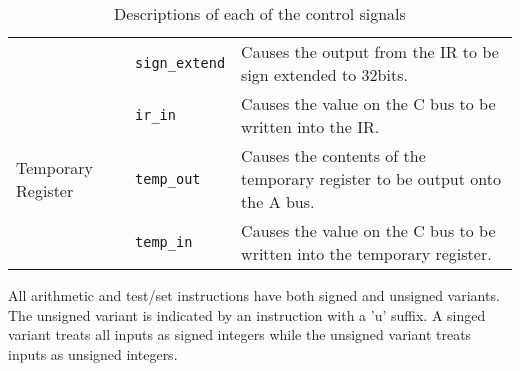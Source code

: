 \documentclass[a4paper,10pt]{article}
\begin{document}
\begin{table}[h]
\begin{center}
\begin{tabular}{|l|l|p{8cm}|}
\cline{2-3}
& \texttt{sign\_extend} & Causes the output from the IR to be sign
extended to 32bits. \\
\cline{2-3}
& \texttt{ir\_in} & Causes the value on the C bus to be written into
the IR. \\
\hline
Temporary Register & \texttt{temp\_out} & Causes the contents of the
temporary register to be output onto the A bus. \\
\cline{2-3}
& \texttt{temp\_in} & Causes the value on the C bus to be written into
the temporary register. \\
\hline
\end{tabular}
\end{center}
\caption{Descriptions of each of the control signals}
\label{table:signals}
\end{table}
\newpage
\begin{table}[h]
All arithmetic and test/set instructions have both signed and unsigned
variants. The unsigned variant is indicated by an instruction with a
'u' suffix. A singed variant treats all inputs as signed integers while
the unsigned variant treats inputs as unsigned integers.


\end{table}
\end{document}
